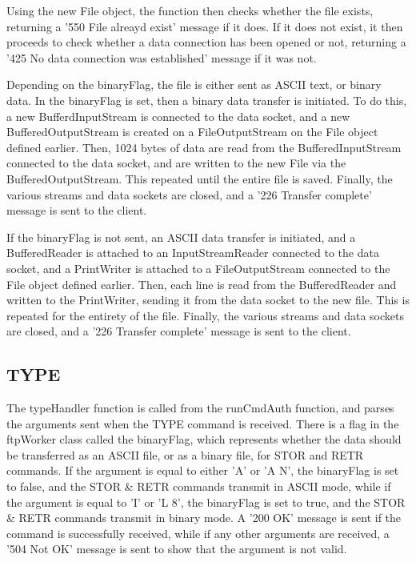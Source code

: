 \documentclass[11pt,a4paper,titlepage]{article}
\begin{document}
Using the new File object, the function then checks whether the file exists, returning a '550 File alreayd exist' message if it does. If it does not exist, it then proceeds to check whether a data connection has been opened or not, returning a '425 No data connection was established' message if it was not.

Depending on the binaryFlag, the file is either sent as ASCII text, or binary data. In the binaryFlag is set, then a binary data transfer is initiated. To do this, a new BufferdInputStream is connected to the data socket, and a new BufferedOutputStream is created on a FileOutputStream on the File object defined earlier. Then, 1024 bytes of data are read from the BufferedInputStream connected to the data socket, and are written to the new File via the BufferedOutputStream. This repeated until the entire file is saved. Finally, the various streams and data sockets are closed, and a '226 Transfer complete' message is sent to the client.

If the binaryFlag is not sent, an ASCII data transfer is initiated, and a BufferedReader is attached to an InputStreamReader connected to the data socket, and a PrintWriter is attached to a FileOutputStream connected to the File object defined earlier. Then, each line is read from the BufferedReader and written to the PrintWriter, sending it from the data socket to the new file. This is repeated for the entirety of the file. Finally, the various streams and data sockets are closed, and a '226 Transfer complete' message is sent to the client.

\subsection{TYPE}
The typeHandler function is called from the runCmdAuth function, and parses the arguments sent when the TYPE command is received. There is a flag in the ftpWorker class called the binaryFlag, which represents whether the data should be transferred as an ASCII file, or as a binary file, for STOR and RETR commands. If the argument is equal to either 'A' or 'A N', the binaryFlag is set to false, and the STOR \& RETR commands transmit in ASCII mode, while if the argument is equal to 'I' or 'L 8', the binaryFlag is set to true, and the STOR \& RETR commands transmit in binary mode. A '200 OK' message is sent if the command is successfully received, while if any other arguments are received, a '504 Not OK' message is sent to show that the argument is not valid.
\end{document}
